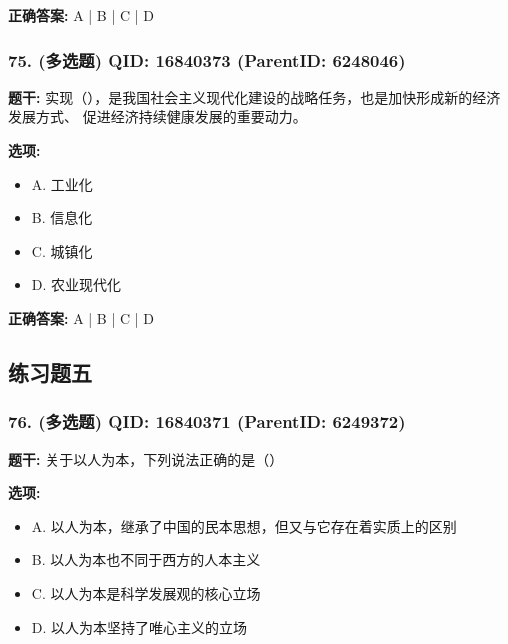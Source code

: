 \documentclass[12pt,UTF8]{ctexart}
\begin{document}
\textbf{正确答案:}
A | B | C | D

\vspace{0.3em}\hrulefill\vspace{0.7em}

\subsubsection*{75. (多选题) \small QID: 16840373 (ParentID: 6248046)}

\textbf{题干:}
实现（），是我国社会主义现代化建设的战略任务，也是加快形成新的经济发展方式、 促进经济持续健康发展的重要动力。



\textbf{选项:}
\begin{itemize}[leftmargin=*]

  \item A. 工业化

  \item B. 信息化

  \item C. 城镇化

  \item D. 农业现代化

\end{itemize}

\textbf{正确答案:}
A | B | C | D

\vspace{0.3em}\hrulefill\vspace{0.7em}

\subsection*{练习题五}

\subsubsection*{76. (多选题) \small QID: 16840371 (ParentID: 6249372)}

\textbf{题干:}
关于以人为本，下列说法正确的是（）



\textbf{选项:}
\begin{itemize}[leftmargin=*]

  \item A. 以人为本，继承了中国的民本思想，但又与它存在着实质上的区别

  \item B. 以人为本也不同于西方的人本主义

  \item C. 以人为本是科学发展观的核心立场

  \item D. 以人为本坚持了唯心主义的立场

\end{itemize}
\end{document}
